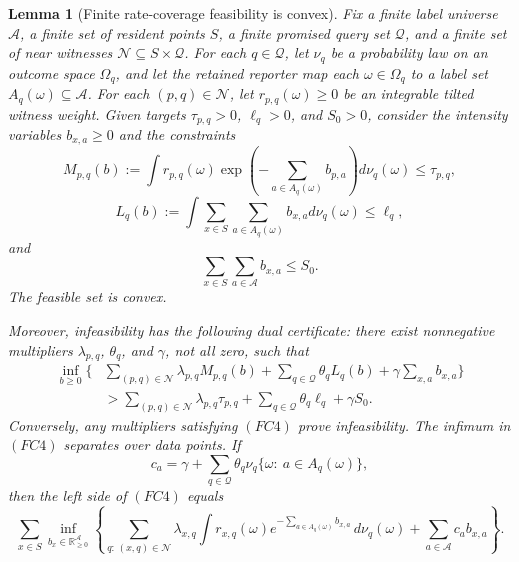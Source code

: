 \documentclass[10pt]{article}
\newtheorem{lemma}[theorem]{Lemma}
\theoremstyle{definition}
\begin{document}
\begin{lemma}[Finite rate-coverage feasibility is convex]
   \label{lem:finite-rate-coverage-convex}
   Fix a finite label universe \(\mathcal A\), a finite set of resident points
   \(S\), a finite promised query set \(\mathcal Q\), and a finite set of near
   witnesses \(\mathcal N\subseteq S\times\mathcal Q\).  For each
   \(q\in\mathcal Q\), let \(\nu_q\) be a probability law on an outcome space
   \(\Omega_q\), and let the retained reporter map each
   \(\omega\in\Omega_q\) to a label set \(A_q(\omega)\subseteq\mathcal A\).
   For each \((p,q)\in\mathcal N\), let
   \(r_{p,q}(\omega)\ge0\) be an integrable tilted witness weight.  Given
   targets \(\tau_{p,q}>0\), \(\ell_q>0\), and \(S_0>0\), consider the intensity
   variables \(b_{x,a}\ge0\) and the constraints
   \[
      M_{p,q}(b)
      :=
      \int r_{p,q}(\omega)
      \exp\!\left(-\sum_{a\in A_q(\omega)}b_{p,a}\right)
      d\nu_q(\omega)
      \le \tau_{p,q},
      \tag{FC1}
   \]
   \[
      L_q(b)
      :=
      \int
      \sum_{x\in S}\sum_{a\in A_q(\omega)}b_{x,a}
      d\nu_q(\omega)
      \le \ell_q,
      \tag{FC2}
   \]
   and
   \[
      \sum_{x\in S}\sum_{a\in\mathcal A}b_{x,a}\le S_0 .
      \tag{FC3}
   \]
   The feasible set is convex.

   Moreover, infeasibility has the following dual certificate: there exist
   nonnegative multipliers \(\lambda_{p,q}\), \(\theta_q\), and \(\gamma\), not
   all zero, such that
   \[
   \begin{aligned}
      \inf_{b\ge0}\Bigg\{
      &\sum_{(p,q)\in\mathcal N}\lambda_{p,q}M_{p,q}(b)
       +\sum_{q\in\mathcal Q}\theta_qL_q(b)
       +\gamma\sum_{x,a}b_{x,a}
      \Bigg\} \\
      &>
      \sum_{(p,q)\in\mathcal N}\lambda_{p,q}\tau_{p,q}
      +\sum_{q\in\mathcal Q}\theta_q\ell_q
      +\gamma S_0 .
   \end{aligned}
      \tag{FC4}
   \]
   Conversely, any multipliers satisfying \((FC4)\) prove infeasibility.
   The infimum in \((FC4)\) separates over data points.  If
   \[
      c_a=
      \gamma+
      \sum_{q\in\mathcal Q}\theta_q
      \nu_q\{\omega:\ a\in A_q(\omega)\},
      \tag{FC5}
   \]
   then the left side of \((FC4)\) equals
   \[
      \sum_{x\in S}
      \inf_{b_x\in\mathbb R_{\ge0}^{\mathcal A}}
      \left\{
      \sum_{q:\,(x,q)\in\mathcal N}
      \lambda_{x,q}
      \int r_{x,q}(\omega)
      e^{-\sum_{a\in A_q(\omega)}b_{x,a}}\,d\nu_q(\omega)
      +
      \sum_{a\in\mathcal A}c_ab_{x,a}
      \right\}.
      \tag{FC6}
   \]
\end{lemma}
\end{document}
